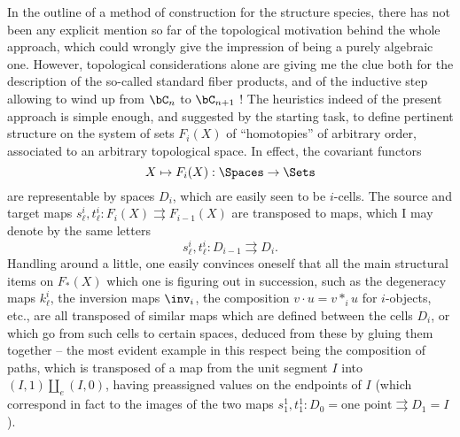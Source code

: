 %
\label{sec:6}%
In the outline of a method of construction for the structure species,
there has not been any explicit mention so far of the topological
motivation behind the whole approach, which could wrongly give the
impression of being a purely algebraic one. However, topological
considerations alone are giving me the clue both for the description
of the so-called standard fiber products, and of the inductive step
allowing to wind up from $\bC_n$ to $\bC_{n+1}$ ! The heuristics
indeed of the present approach is simple enough, and suggested by the
starting task, to define pertinent structure on the system of sets
$F_i(X)$ of ``homotopies'' of arbitrary order, associated to an
arbitrary topological space. In effect, the covariant functors
\[ X \mapsto F_i(X) : \Spaces \to \Sets
\]
are representable by spaces $D_i$, which are easily seen to be
$i$-cells. The source and target maps $s_\ell^i, t_\ell^i :
F_i(X) \rightrightarrows F_{i-1}(X)$ are transposed to maps, which I may
denote by the same letters
\[s_\ell^i, t_\ell^i : D_{i-1} \rightrightarrows D_i.\]
Handling around a little, one easily convinces oneself that all the
main structural items on $F_*(X)$ which one is figuring out in
succession, such as the degeneracy maps $k_\ell^i$, the inversion maps
$\inv_i$, the composition $v\cdot u = v *_i u$ for $i$-objects, etc.,
are all transposed of similar maps which are defined between the cells
$D_i$, or which go from such cells to certain spaces, deduced from
these by gluing them together -- the most evident example in this
respect being the composition of paths, which is transposed of a map
from the unit segment $I$ into $(I,1)\amalg_e (I,0)$, having
preassigned values on the endpoints of $I$ (which correspond in fact
to the images of the two maps $s_1^1,t_1^1 : D_0
= \text{one point} \rightrightarrows D_1 =
I$). 

